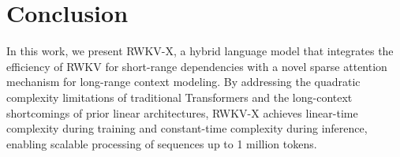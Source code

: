\section{Conclusion}
In this work, we present RWKV-X, a hybrid language model that integrates the efficiency of RWKV for short-range dependencies with a novel sparse attention mechanism for long-range context modeling. By addressing the quadratic complexity limitations of traditional Transformers and the long-context shortcomings of prior linear architectures, RWKV-X achieves linear-time complexity during training and constant-time complexity during inference, enabling scalable processing of sequences up to 1 million tokens.